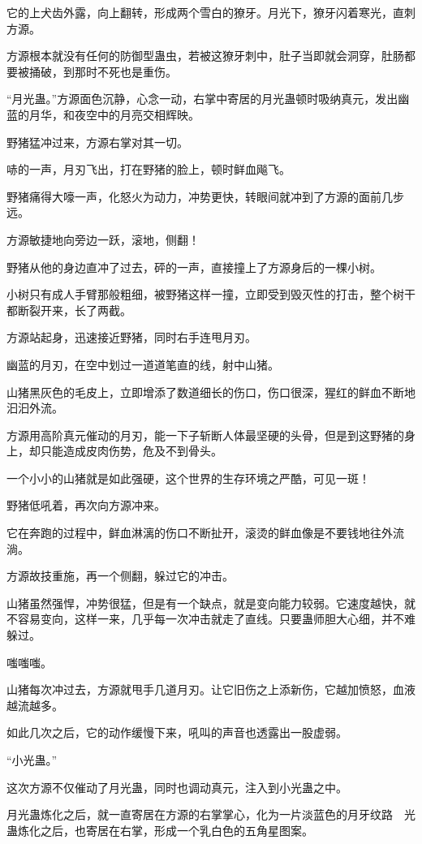 \begin{this_body}
它的上犬齿外露，向上翻转，形成两个雪白的獠牙。月光下，獠牙闪着寒光，直刺方源。

方源根本就没有任何的防御型蛊虫，若被这獠牙刺中，肚子当即就会洞穿，肚肠都要被捅破，到那时不死也是重伤。

“月光蛊。”方源面色沉静，心念一动，右掌中寄居的月光蛊顿时吸纳真元，发出幽蓝的月华，和夜空中的月亮交相辉映。

野猪猛冲过来，方源右掌对其一切。

哧的一声，月刃飞出，打在野猪的脸上，顿时鲜血飚飞。

野猪痛得大嚎一声，化怒火为动力，冲势更快，转眼间就冲到了方源的面前几步远。

方源敏捷地向旁边一跃，滚地，侧翻！

野猪从他的身边直冲了过去，砰的一声，直接撞上了方源身后的一棵小树。

小树只有成人手臂那般粗细，被野猪这样一撞，立即受到毁灭性的打击，整个树干都断裂开来，长了两截。

方源站起身，迅速接近野猪，同时右手连甩月刃。

幽蓝的月刃，在空中划过一道道笔直的线，射中山猪。

山猪黑灰色的毛皮上，立即增添了数道细长的伤口，伤口很深，猩红的鲜血不断地汩汩外流。

方源用高阶真元催动的月刃，能一下子斩断人体最坚硬的头骨，但是到这野猪的身上，却只能造成皮肉伤势，危及不到骨头。

一个小小的山猪就是如此强硬，这个世界的生存环境之严酷，可见一斑！

野猪低吼着，再次向方源冲来。

它在奔跑的过程中，鲜血淋漓的伤口不断扯开，滚烫的鲜血像是不要钱地往外流淌。

方源故技重施，再一个侧翻，躲过它的冲击。

山猪虽然强悍，冲势很猛，但是有一个缺点，就是变向能力较弱。它速度越快，就不容易变向，这样一来，几乎每一次冲击就走了直线。只要蛊师胆大心细，并不难躲过。

嗤嗤嗤。

山猪每次冲过去，方源就甩手几道月刃。让它旧伤之上添新伤，它越加愤怒，血液越流越多。

如此几次之后，它的动作缓慢下来，吼叫的声音也透露出一股虚弱。

“小光蛊。”

这次方源不仅催动了月光蛊，同时也调动真元，注入到小光蛊之中。

月光蛊炼化之后，就一直寄居在方源的右掌掌心，化为一片淡蓝色的月牙纹路　光蛊炼化之后，也寄居在右掌，形成一个乳白色的五角星图案。


\end{this_body}
